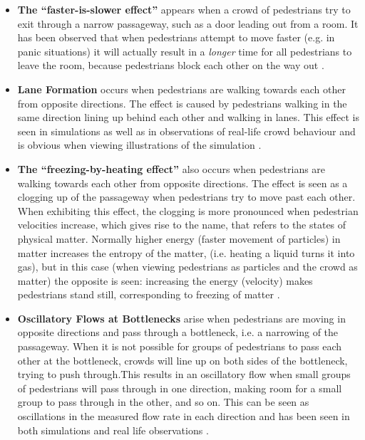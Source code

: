 \begin{itemize}
    \item \textbf{The ``faster-is-slower effect''}  appears when a crowd of 
        pedestrians try to exit through a narrow passageway, such as a door 
        leading out from a room. It has been observed that when pedestrians 
        attempt to move faster (e.g. in panic situations) it will actually 
        result in a \emph{longer} time for all pedestrians to leave the room, 
        because pedestrians block each other on the way out \cite{helbing00}.

    \item \textbf{Lane Formation} occurs when pedestrians are walking towards 
        each other from opposite directions. The effect is caused by 
        pedestrians walking in the same direction lining up behind each other 
        and walking in lanes. This effect is seen in simulations as well as in 
        observations of real-life crowd behaviour and is obvious when viewing 
        illustrations of the simulation \cite{self-org}.
        
    \item \textbf{The ``freezing-by-heating effect''} also occurs when 
        pedestrians are walking towards each other from opposite directions. 
        The effect is seen as a clogging up of the passageway when pedestrians 
        try to move past each other. When exhibiting this effect, the clogging 
        is more pronounced when pedestrian velocities increase, which gives 
        rise to the name, that refers to the states of physical matter. 
        Normally higher energy (faster movement of particles) in matter 
        increases the entropy of the matter, (i.e.  heating a liquid turns it 
        into gas), but in this case (when viewing pedestrians as particles and 
        the crowd as matter) the opposite is seen: increasing the energy 
        (velocity) makes pedestrians stand still, corresponding to freezing of 
        matter \cite{frebyheat}.
        
    \item \textbf{Oscillatory Flows at Bottlenecks} arise when pedestrians are 
        moving in opposite directions and pass through a bottleneck, i.e.  a 
        narrowing of the passageway.  When it is not possible for groups of 
        pedestrians to pass each other at the bottleneck, crowds will line up 
        on both sides of the bottleneck, trying to push through.This results 
        in an oscillatory flow when small groups of pedestrians will pass 
        through in one direction, making room for a small group to pass 
        through in the other, and so on.  This can be seen as oscillations in 
        the measured flow rate in each direction and has been seen in both 
        simulations and real life observations \cite{self-org}.
\end{itemize}

